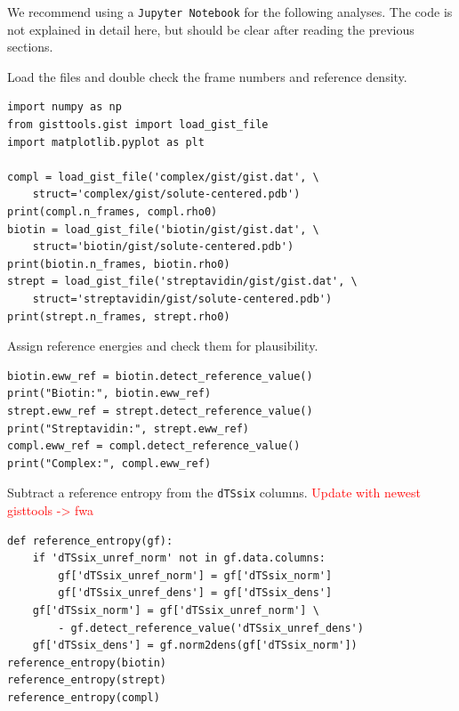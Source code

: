 \documentclass[9pt,tutorial]{livecoms}
\newcommand{\software}{\texttt}
\newcommand{\todo}{\textcolor{red}}
\newcommand\inlinecode{\texttt}
\begin{document}
We recommend using a \software{Jupyter Notebook} for the following analyses.
The code is not explained in detail here, but should be clear after reading the previous sections.

Load the files and double check the frame numbers and reference density.
\begin{lstlisting}[style=python]
import numpy as np
from gisttools.gist import load_gist_file
import matplotlib.pyplot as plt

compl = load_gist_file('complex/gist/gist.dat', \
    struct='complex/gist/solute-centered.pdb')
print(compl.n_frames, compl.rho0)
biotin = load_gist_file('biotin/gist/gist.dat', \
    struct='biotin/gist/solute-centered.pdb')
print(biotin.n_frames, biotin.rho0)
strept = load_gist_file('streptavidin/gist/gist.dat', \
    struct='streptavidin/gist/solute-centered.pdb')
print(strept.n_frames, strept.rho0)
\end{lstlisting}
Assign reference energies and check them for plausibility.
\begin{lstlisting}[style=python]
biotin.eww_ref = biotin.detect_reference_value()
print("Biotin:", biotin.eww_ref)
strept.eww_ref = strept.detect_reference_value()
print("Streptavidin:", strept.eww_ref)
compl.eww_ref = compl.detect_reference_value()
print("Complex:", compl.eww_ref)
\end{lstlisting}

Subtract a reference entropy from the \inlinecode{dTSsix} columns.
\todo{Update with newest gisttools -> fwa}
\begin{lstlisting}[style=python]
def reference_entropy(gf):
    if 'dTSsix_unref_norm' not in gf.data.columns:
        gf['dTSsix_unref_norm'] = gf['dTSsix_norm']
        gf['dTSsix_unref_dens'] = gf['dTSsix_dens']
    gf['dTSsix_norm'] = gf['dTSsix_unref_norm'] \
        - gf.detect_reference_value('dTSsix_unref_dens')
    gf['dTSsix_dens'] = gf.norm2dens(gf['dTSsix_norm'])
reference_entropy(biotin)
reference_entropy(strept)
reference_entropy(compl)
\end{lstlisting}
\end{document}
